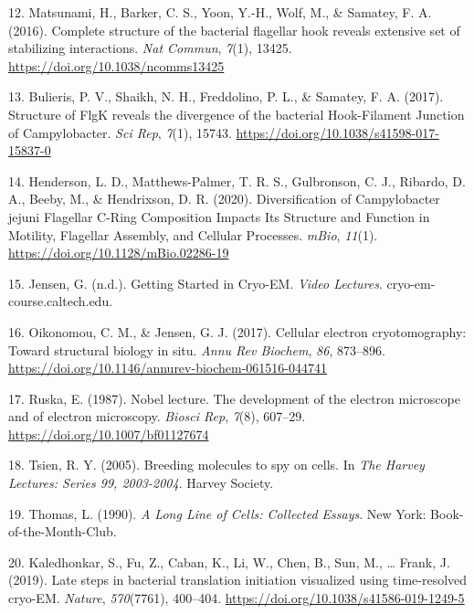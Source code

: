 \documentclass[]{tufte-book}
\begin{document}
\leavevmode\hypertarget{ref-matsunami2016}{}%
12. Matsunami, H., Barker, C. S., Yoon, Y.-H., Wolf, M., \& Samatey, F. A. (2016). Complete structure of the bacterial flagellar hook reveals extensive set of stabilizing interactions. \emph{Nat Commun}, \emph{7}(1), 13425. \url{https://doi.org/10.1038/ncomms13425}

\leavevmode\hypertarget{ref-bulieris2017}{}%
13. Bulieris, P. V., Shaikh, N. H., Freddolino, P. L., \& Samatey, F. A. (2017). Structure of FlgK reveals the divergence of the bacterial Hook-Filament Junction of Campylobacter. \emph{Sci Rep}, \emph{7}(1), 15743. \url{https://doi.org/10.1038/s41598-017-15837-0}

\leavevmode\hypertarget{ref-henderson2020}{}%
14. Henderson, L. D., Matthews-Palmer, T. R. S., Gulbronson, C. J., Ribardo, D. A., Beeby, M., \& Hendrixson, D. R. (2020). Diversification of Campylobacter jejuni Flagellar C-Ring Composition Impacts Its Structure and Function in Motility, Flagellar Assembly, and Cellular Processes. \emph{mBio}, \emph{11}(1). \url{https://doi.org/10.1128/mBio.02286-19}

\leavevmode\hypertarget{ref-jensenInternet}{}%
15. Jensen, G. (n.d.). Getting Started in Cryo-EM. \emph{Video Lectures}. cryo-em-course.caltech.edu.

\leavevmode\hypertarget{ref-oikonomou2017}{}%
16. Oikonomou, C. M., \& Jensen, G. J. (2017). Cellular electron cryotomography: Toward structural biology in situ. \emph{Annu Rev Biochem}, \emph{86}, 873--896. \url{https://doi.org/10.1146/annurev-biochem-061516-044741}

\leavevmode\hypertarget{ref-ruska1987}{}%
17. Ruska, E. (1987). Nobel lecture. The development of the electron microscope and of electron microscopy. \emph{Biosci Rep}, \emph{7}(8), 607--29. \url{https://doi.org/10.1007/bf01127674}

\leavevmode\hypertarget{ref-tsien2005}{}%
18. Tsien, R. Y. (2005). Breeding molecules to spy on cells. In \emph{The Harvey Lectures: Series 99, 2003-2004}. Harvey Society.

\leavevmode\hypertarget{ref-thomas1990}{}%
19. Thomas, L. (1990). \emph{A Long Line of Cells: Collected Essays}. New York: Book-of-the-Month-Club.

\leavevmode\hypertarget{ref-kaledhonkar2019}{}%
20. Kaledhonkar, S., Fu, Z., Caban, K., Li, W., Chen, B., Sun, M., \ldots{} Frank, J. (2019). Late steps in bacterial translation initiation visualized using time-resolved cryo-EM. \emph{Nature}, \emph{570}(7761), 400--404. \url{https://doi.org/10.1038/s41586-019-1249-5}
\end{document}
